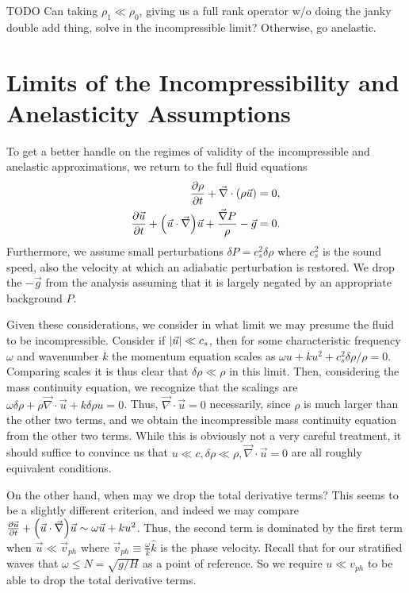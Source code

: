 \documentclass[11pt,
        usenames, %
        dvipsnames %
    ]{report}
\newcommand*{\pd}[2]{\frac{\partial#1}{\partial#2}}
\DeclarePairedDelimiter\abs{\lvert}{\rvert}
\DeclarePairedDelimiter\p{\lparen}{\rparen}
\begin{document}
TODO Can taking $\rho_1 \ll \rho_0$, giving us a full rank operator w/o doing
the janky double add thing, solve in the incompressible limit? Otherwise, go
anelastic.

\section{Limits of the Incompressibility and Anelasticity Assumptions}

To get a better handle on the regimes of validity of the incompressible and
anelastic approximations, we return to the full fluid equations
\begin{equation}
    \begin{split}
        \pd{\rho}{t} + \vec{\nabla} \cdot \p*{\rho \vec{u}} &= 0,\\
        \pd{\vec{u}}{t} + \p*{\vec{u} \cdot \vec{\nabla}}\vec{u} +
            \frac{\vec{\nabla}P}{\rho} - \vec{g} &= 0.
    \end{split}
\end{equation}
Furthermore, we assume small perturbations $\delta P = c_s^2 \delta \rho$ where
$c_s^2$ is the sound speed, also the velocity at which an adiabatic perturbation
is restored. We drop the $-\vec{g}$ from the analysis assuming that it is
largely negated by an appropriate background $P$.

Given these considerations, we consider in what limit we may presume the fluid
to be incompressible. Consider if $\abs*{\vec{u}} \ll c_s$, then for some
characteristic frequency $\omega$ and wavenumber $k$ the momentum equation
scales as $\omega u + ku^2 + c_s^2 \delta \rho/\rho = 0$. Comparing scales it is
thus clear that $\delta \rho \ll \rho$ in this limit. Then, considering the
mass continuity equation, we recognize that the scalings are $\omega \delta \rho
+ \rho \vec{\nabla} \cdot \vec{u} + k\delta \rho u = 0$. Thus, $\vec{\nabla}
\cdot \vec{u} = 0$ necessarily, since $\rho$ is much larger than the other two
terms, and we obtain the incompressible mass continuity equation from the other
two terms. While this is obviously not a very careful treatment, it should
suffice to convince us that $u \ll c, \delta \rho \ll \rho, \vec{\nabla} \cdot
\vec{u} = 0$ are all roughly equivalent conditions.

On the other hand, when may we drop the total derivative terms? This seems to be
a slightly different criterion, and indeed we may compare $\pd{\vec{u}}{t} +
\p*{\vec{u} \cdot \vec{\nabla}} \vec{u} \sim \omega \vec{u} + ku^2$. Thus, the
second term is dominated by the first term when $\vec{u} \ll \vec{v}_{ph}$ where
$\vec{v}_{ph} \equiv \frac{\omega}{k}\hat{k}$ is the phase velocity. Recall that
for our stratified waves that $\omega \leq N = \sqrt{g/H}$ as a point of
reference. So we require $u \ll v_{ph}$ to be able to drop the total derivative
terms.
\end{document}
